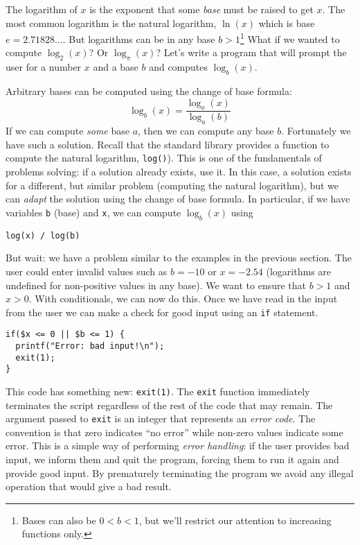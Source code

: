The logarithm of $x$ is the exponent that some \emph{base} must 
be raised to get $x$.  The most common logarithm is the natural logarithm, 
$\ln{(x)}$ which is base $e = 2.71828\ldots$.  But logarithms can be in any base 
$b > 1$\footnote{Bases can also be $0< b < 1$, but we'll restrict our attention to
increasing functions only.}  What if we wanted to compute $\log_2{(x)}$?  
Or $\log_{\pi}{(x)}$?  Let's write a program that will prompt the user for a
number $x$ and a base $b$ and computes $\log_b{(x)}$.

Arbitrary bases can be computed using the change of base formula: 
  $$\log_b(x) = \frac{\log_a{(x)}}{\log_a{(b)}}$$
If we can compute \emph{some} base $a$, then we can compute any base 
$b$.  Fortunately we have such a solution.  Recall that the standard library 
provides a function to compute the natural logarithm, \texttt{log()}).
This is one of the fundamentals of problems solving: if a solution already 
exists, use it.  In this case, a solution exists for a different, but similar problem
(computing the natural logarithm), but we can \emph{adapt} the solution 
using the change of base formula.  In particular, if we have variables 
\texttt{b} (base) and \texttt{x}, we can compute $\log_b{(x)}$ using

  \texttt{log(x) / log(b)}
  
But wait: we have a problem similar to the examples in the previous section.  
The user could enter invalid values such as $b = -10$ or $x = -2.54$ 
(logarithms are undefined for non-positive values in any base).  We want
to ensure that $b > 1$ and $x > 0$.  With conditionals, we can now do this.  
Once we have read in the input from the user we can make a check for
good input using an \texttt{if} statement.

\begin{verbatim}
if($x <= 0 || $b <= 1) {
  printf("Error: bad input!\n");
  exit(1);
}
\end{verbatim}

This code has something new: \texttt{exit(1)}.  The \texttt{exit}
function immediately terminates the script regardless of the rest of the
code that may remain.  The argument passed to \texttt{exit} is an 
integer that represents an \emph{error code}.  The convention is that 
zero indicates ``no error'' while non-zero values indicate some error.  This
is a simple way of performing \emph{error handling}: if the user provides
bad input, we inform them and quit the program, forcing them to run it
again and provide good input.  By prematurely terminating the program
we avoid any illegal operation that would give a bad result.

